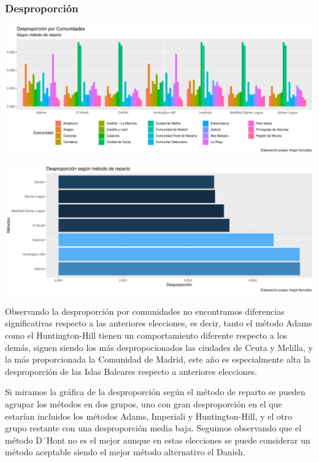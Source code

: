 \documentclass[12pt,a4paper,]{book}
\numberwithin{dummy}{section}
\theoremstyle{ocrenumbox}
\theoremstyle{blacknumex}
\theoremstyle{blacknumbox}
\theoremstyle{ocrenum}
\theoremstyle{ocrenum}
\begin{document}
\hypertarget{desproporciuxf3n-7}{%
\subsubsection{Desproporción}\label{desproporciuxf3n-7}}

\begin{center}\includegraphics[width=0.95\linewidth]{figurasR/unnamed-chunk-75-1} \end{center}

\begin{center}\includegraphics[width=0.95\linewidth]{figurasR/unnamed-chunk-75-2} \end{center}

Observando la desproporción por comunidades no encontramos diferencias
significativas respecto a las anteriores elecciones, es decir, tanto el
método Adams como el Huntington-Hill tienen un comportamiento diferente
respecto a los demás, siguen siendo los más despropocionados las
ciudades de Ceuta y Melilla, y la más proporcionada la Comunidad de
Madrid, este año es especialmente alta la desproporción de las Islas
Baleares respecto a anteriores elecciones.

Si miramos la gráfica de la desproporción según el método de reparto se
pueden agrupar los métodos en dos grupos, uno con gran desproporción en
el que estarían incluidos los métodos Adams, Imperiali y
Huntington-Hill, y el otro grupo restante con una desproporción media
baja. Seguimos observando que el método D´Hont no es el mejor aunque en
estas elecciones se puede considerar un método aceptable siendo el mejor
método alternativo el Danish.
\end{document}
